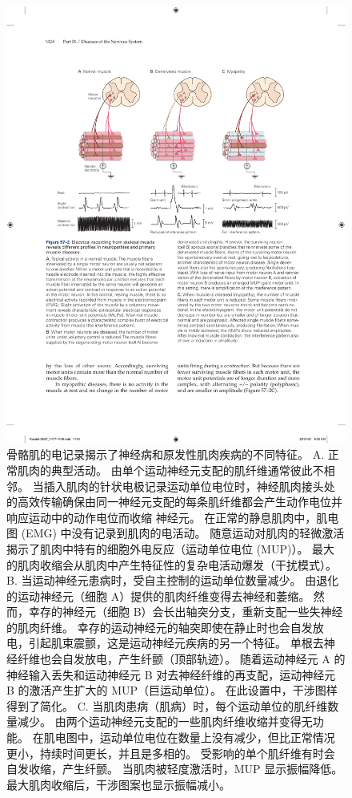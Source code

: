 \begin{figure}[htbp]
	\centering
	\includegraphics[width=0.8\linewidth]{chap57/fig_57_2}
	\caption{骨骼肌的电记录揭示了神经病和原发性肌肉疾病的不同特征。 A. 正常肌肉的典型活动。 由单个运动神经元支配的肌纤维通常彼此不相邻。 当插入肌肉的针状电极记录运动单位电位时，神经肌肉接头处的高效传输确保由同一神经元支配的每条肌纤维都会产生动作电位并响应运动中的动作电位而收缩 神经元。 在正常的静息肌肉中，肌电图 (EMG) 中没有记录到肌肉的电活动。 随意运动对肌肉的轻微激活揭示了肌肉中特有的细胞外电反应（运动单位电位 (MUP)）。 最大的肌肉收缩会从肌肉中产生特征性的复杂电活动爆发（干扰模式）。 B. 当运动神经元患病时，受自主控制的运动单位数量减少。 由退化的运动神经元（细胞 A）提供的肌肉纤维变得去神经和萎缩。 然而，幸存的神经元（细胞 B）会长出轴突分支，重新支配一些失神经的肌肉纤维。 幸存的运动神经元的轴突即使在静止时也会自发放电，引起肌束震颤，这是运动神经元疾病的另一个特征。 单根去神经纤维也会自发放电，产生纤颤（顶部轨迹）。 随着运动神经元 A 的神经输入丢失和运动神经元 B 对去神经纤维的再支配，运动神经元 B 的激活产生扩大的 MUP（巨运动单位）。 在此设置中，干涉图样得到了简化。 C. 当肌肉患病（肌病）时，每个运动单位的肌纤维数量减少。 由两个运动神经元支配的一些肌肉纤维收缩并变得无功能。 在肌电图中，运动单位电位在数量上没有减少，但比正常情况更小，持续时间更长，并且是多相的。 受影响的单个肌纤维有时会自发收缩，产生纤颤。 当肌肉被轻度激活时，MUP 显示振幅降低。 最大肌肉收缩后，干涉图案也显示振幅减小。}
	\label{fig:57_2}
\end{figure}

